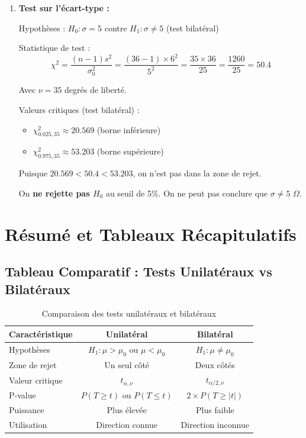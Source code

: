 \documentclass[11pt,a4paper]{article}
\begin{document}
\begin{enumerate}
    \item \textbf{Test sur l'écart-type :}
    
    Hypothèses : $H_0 : \sigma = 5$ contre $H_1 : \sigma \neq 5$ (test bilatéral)
    
    Statistique de test :
    $$\chi^2 = \frac{(n-1)s^2}{\sigma_0^2} = \frac{(36-1) \times 6^2}{5^2} = \frac{35 \times 36}{25} = \frac{1260}{25} = 50.4$$
    
    Avec $\nu = 35$ degrés de liberté.
    
    Valeurs critiques (test bilatéral) :
    \begin{itemize}
        \item $\chi^2_{0.025, 35} \approx 20.569$ (borne inférieure)
        \item $\chi^2_{0.975, 35} \approx 53.203$ (borne supérieure)
    \end{itemize}
    
    Puisque $20.569 < 50.4 < 53.203$, on n'est pas dans la zone de rejet.
    
    On \textbf{ne rejette pas $H_0$} au seuil de 5\%. On ne peut pas conclure que $\sigma \neq 5$ $\Omega$.
\end{enumerate}

\newpage

\section{Résumé et Tableaux Récapitulatifs}

\subsection{Tableau Comparatif : Tests Unilatéraux vs Bilatéraux}

\begin{table}[h]
\centering
\small
\begin{tabular}{|l|c|c|}
\hline
\textbf{Caractéristique} & \textbf{Unilatéral} & \textbf{Bilatéral} \\
\hline
Hypothèses & $H_1 : \mu > \mu_0$ ou $\mu < \mu_0$ & $H_1 : \mu \neq \mu_0$ \\
\hline
Zone de rejet & Un seul côté & Deux côtés \\
\hline
Valeur critique & $t_{\alpha, \nu}$ & $t_{\alpha/2, \nu}$ \\
\hline
P-value & $P(T \geq t)$ ou $P(T \leq t)$ & $2 \times P(T \geq |t|)$ \\
\hline
Puissance & Plus élevée & Plus faible \\
\hline
Utilisation & Direction connue & Direction inconnue \\
\hline
\end{tabular}
\caption{Comparaison des tests unilatéraux et bilatéraux}
\end{table}
\end{document}
